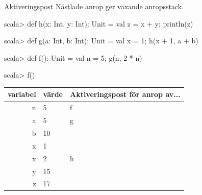 %
%
%

\begin{Slide}{Aktiveringspost}\SlideFontSmall
Nästlade anrop ger växande anropsstack.
\begin{REPLsmall}
scala> def h(x: Int, y: Int): Unit = { val z = x + y; println(z) }

scala> def g(a: Int, b: Int): Unit = { val x = 1; h(x + 1, a + b) }

scala> def f(): Unit = { val n = 5; g(n, 2 * n) }

scala> f()

\end{REPLsmall}

\pause
{}

\begin{tabular}{|r | l | l |} \hline

variabel & värde & Aktiveringspost för anrop av... \\ \hline \hline
\pause
 n & 5 & f \\ \hline
 \pause
 a & 5 & g \\
 b & 10 &  \\
 x & 1  &  \\  \hline
 \pause
 x & 2  & h \\
 y & 15 &  \\
 z & 17 & \\ \hline
\end{tabular}
\end{Slide}

